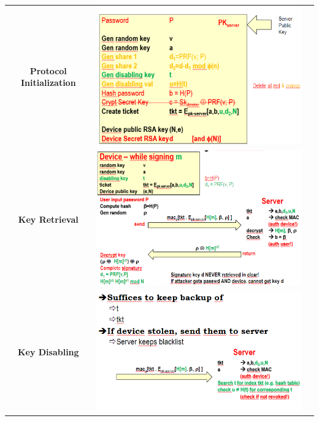 \documentclass{book}
\begin{document}
\begin{tabular}{ccc}
	\textbf{Protocol Initialization} & \includegraphics[scale=0.4]{2022-01-06-17-31-58.png} %
	                                 &                                                      \\
	\textbf{Key Retrieval}
	                                 & \includegraphics[scale=0.5]{2022-01-06-17-33-30.png} %
	                                 &
	\\\textbf{Key Disabling}&
	\includegraphics[scale=0.5]{2022-01-06-17-34-40.png}%
	                                 &
\end{tabular}
\end{document}
